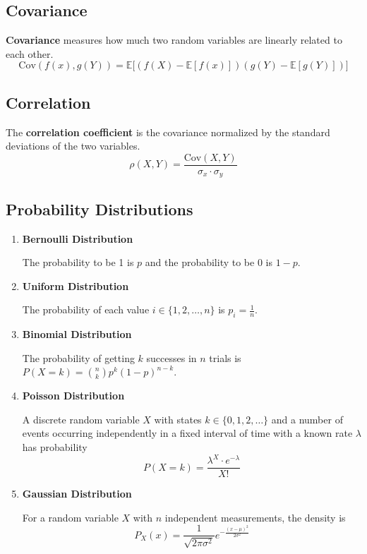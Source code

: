 \documentclass{article}
\begin{document}
\subsection*{Covariance}
\textbf{Covariance} measures how much two random variables are linearly related to each other.
\[\text{Cov}(f(x), g(Y))=\mathbb{E}\Big[(f(X)-\mathbb{E}[f(x)])(g(Y)-\mathbb{E}[g(Y)])\Big]\]

\subsection*{Correlation}
The \textbf{correlation coefficient} is the covariance normalized by the standard deviations of the two variables.
\[\rho(X, Y)=\frac{\text{Cov}(X, Y)}{\sigma_x\cdot\sigma_y}\]

\subsection*{Probability Distributions}
\begin{enumerate}
    \item \textbf{Bernoulli Distribution}
    
    The probability to be 1 is $p$ and the probability to be 0 is $1-p$.

    \item \textbf{Uniform Distribution}
    
    The probability of each value $i\in\{1, 2, \ldots, n\}$ is $p_i=\frac{1}{n}$.

    \item \textbf{Binomial Distribution}
    
    The probability of getting $k$ successes in $n$ trials is $P(X=k)=\binom{n}{k}p^k {(1-p)}^{n-k}$.

    \item \textbf{Poisson Distribution}
    
    A discrete random variable $X$ with states $k\in\{0, 1, 2, \ldots\}$ and a number of events occurring independently in a fixed interval of time with a known rate $\lambda$ has probability
    \[P(X=k)=\frac{\lambda^X\cdot e^{-\lambda}}{X!}\]

    \item \textbf{Gaussian Distribution}
    
    For a random variable $X$ with $n$ independent measurements, the density is
    \[P_X(x)=\frac{1}{\sqrt{2\pi\sigma^2}}e^{-\frac{{(x-\mu)}^2}{2\sigma^2}}\]
\end{enumerate}
\end{document}
